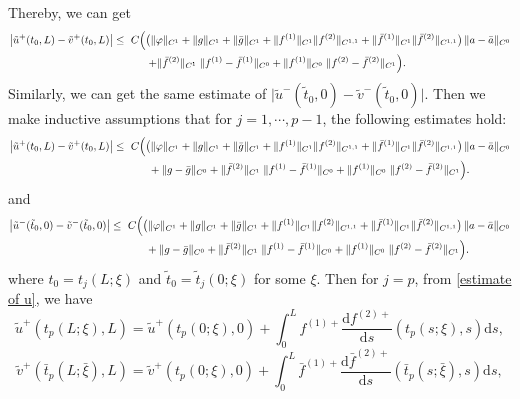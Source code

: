 \documentclass[a4paper,reqno,11pt]{amsart}
\numberwithin{equation}{section} %
\begin{document}
Thereby, we can get
$$
\begin{aligned}
\bigl|\tilde u^+(t_0,L)-\tilde{v}^{+}(t_0,L)\bigr|
\le{}&\ C\Bigl(
  \bigl(\|\varphi\|_{C^{1}}+\|g\|_{C^{1}}+\|\bar g\|_{C^{1}}
   + \|f^{(1)}\|_{C^{1}}\|f^{(2)}\|_{C^{1,1}}
   + \|\bar f^{(1)}\|_{C^{1}}\|\bar f^{(2)}\|_{C^{1,1}}\bigr)\,
   \|a-\bar a\|_{C^{0}} \Bigr.\\
&\qquad \Bigl.+ \|\bar f^{(2)}\|_{C^{1}}\;\|f^{(1)}-\bar f^{(1)}\|_{C^{0}}
        + \|f^{(1)}\|_{C^{0}}\;\|f^{(2)}-\bar f^{(2)}\|_{C^{1}}
\Bigr).
\end{aligned}
$$
Similarly, we can get the same estimate of $\bigl|\tilde u^-(\tilde{t} _0,0)-\tilde{v}^{-}(\tilde{t} _0,0)\bigr|$.
Then we make inductive assumptions that for $j=1,\cdots,p-1$, the following estimates hold:
$$
\begin{aligned}
\bigl|\tilde u^+(t_0,L)-\tilde{v}^{+}(t_0,L)\bigr|
\le{}&\ C\Bigl(
  \bigl(\|\varphi\|_{C^{1}}+\|g\|_{C^{1}}+\|\bar g\|_{C^{1}}
  + \|f^{(1)}\|_{C^{1}}\|f^{(2)}\|_{C^{1,1}}
  + \|\bar f^{(1)}\|_{C^{1}}\|\bar f^{(2)}\|_{C^{1,1}}\bigr)\,
  \|a-\bar a\|_{C^{0}} \Bigr.\\
&\qquad + \Bigl. \|g-\bar g\|_{C^{0}}
  + \|\bar f^{(2)}\|_{C^{1}}\;\|f^{(1)}-\bar f^{(1)}\|_{C^{0}}
  + \|f^{(1)}\|_{C^{0}}\;\|f^{(2)}-\bar f^{(2)}\|_{C^{1}}
\Bigr).
\end{aligned}
$$
and
$$
\begin{aligned}
\bigl|\tilde u^-(\tilde{t} _0,0)-\tilde{v}^{-}(\tilde{t} _0,0)\bigr|
\le{}&\ C\Bigl(
  \bigl(\|\varphi\|_{C^{1}}+\|g\|_{C^{1}}+\|\bar g\|_{C^{1}}
  + \|f^{(1)}\|_{C^{1}}\|f^{(2)}\|_{C^{1,1}}
  + \|\bar f^{(1)}\|_{C^{1}}\|\bar f^{(2)}\|_{C^{1,1}}\bigr)\,
  \|a-\bar a\|_{C^{0}} \Bigr.\\
&\qquad + \Bigl. \|g-\bar g\|_{C^{0}}
  + \|\bar f^{(2)}\|_{C^{1}}\;\|f^{(1)}-\bar f^{(1)}\|_{C^{0}}
  + \|f^{(1)}\|_{C^{0}}\;\|f^{(2)}-\bar f^{(2)}\|_{C^{1}}
\Bigr).
\end{aligned}
$$
where $t_0=t_j(L;\xi)$ and $\tilde{t} _0=\tilde{t} _j(0;\xi)$ for some $\xi$. Then for $j=p$, from \eqref{estimate of u}, we have
$$
\tilde{u}^{+}\left( t_p\left( L;\xi \right) ,L \right) =\tilde{u}^{+}\left( t_p\left( 0;\xi \right) ,0 \right) +\int_{0}^L{f^{(1)+}\frac{\mathrm{d}f^{(2)+}}{\mathrm{d}s}\left( t_p\left( s;\xi \right) ,s \right) \mathrm{d}s},
$$
$$
\tilde{v}^{+}\left( \bar{t}_p\left( L;\bar{\xi} \right) ,L \right) =\tilde{v}^{+}\left( t_p\left( 0;\xi \right) ,0 \right) +\int_{0 }^L{\bar{f}^{(1)+}\frac{\mathrm{d}\bar{f}^{(2)+}}{\mathrm{d}s}\left( \bar{t}_p\left( s;\bar{\xi} \right) ,s \right) \mathrm{d}s},
$$
\end{document}
